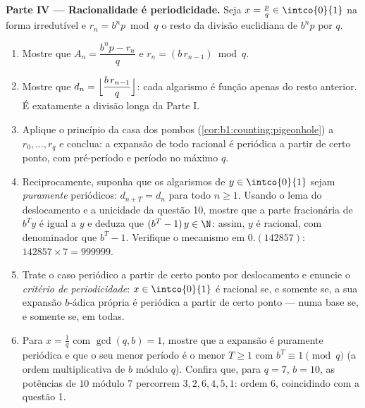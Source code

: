 \begin{problem}
\medskip
\noindent\textbf{Parte IV --- Racionalidade é periodicidade.} Seja $x
= \frac pq \in \intco{0}{1}$ na forma irredutível e $r_n = b^n p
\bmod q$ o resto da divisão euclidiana de $b^n p$ por
$q$.
\begin{enumerate}
  \item Mostre que $A_n = \dfrac{b^n p - r_n}{q}$ e $r_n =
        (b\,r_{n-1}) \bmod q$.
  \item Mostre que $d_n = \Bigl\lfloor \dfrac{b\,r_{n-1}}{q}
        \Bigr\rfloor$: cada algarismo é função apenas do resto
        anterior. É exatamente a divisão longa da Parte I.
  \item Aplique o princípio da casa dos pombos
        (\cref{cor:b1:counting:pigeonhole}) a $r_0, \dots, r_q$
        e conclua: a expansão de todo racional é
        periódica a partir de certo ponto, com pré-período e período no
        máximo $q$.
  \item Reciprocamente, suponha que os algarismos de $y \in \intco{0}{1}$
        sejam \emph{puramente} periódicos: $d_{n+T} = d_n$ para todo $n
        \geq 1$. Usando o lema do deslocamento e a unicidade da
        questão 10, mostre que a parte fracionária de $b^T y$
        é igual a $y$ e deduza que $(b^T - 1)\,y \in \N$: assim, $y$ é
        racional, com denominador que  $b^T - 1$. Verifique o
        mecanismo em $0.(142857)$: $142857 \times 7 = 999999$.
  \item Trate o caso periódico a partir de certo ponto por deslocamento
        e enuncie o \emph{critério de periodicidade}: $x \in \intco{0}{1}$ é
        racional se, e somente se, a sua expansão $b$-ádica própria é
        periódica a partir de certo ponto --- numa base se, e somente se,
        em todas.
  \item Para $x = \frac 1q$ com $\gcd(q, b) = 1$, mostre que a
        expansão é puramente periódica e que o seu menor período é
        o menor $T \geq 1$ com $b^T \equiv 1 \pmod q$ (a
        ordem multiplicativa de $b$ módulo $q$). Confira que, para
        $q = 7$, $b = 10$, as potências de $10$ módulo $7$ percorrem
        $3, 2, 6, 4, 5, 1$: ordem $6$, coincidindo com a questão
        1.
\end{enumerate}


\end{problem}

